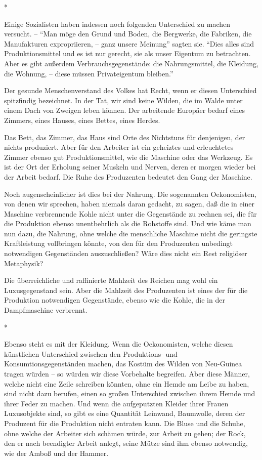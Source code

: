 \documentclass{scrbook}
\begin{document}
\begin{center}*\end{center}

Einige Sozialisten haben indessen noch folgenden Unterschied zu machen versucht. – ``Man möge den Grund und Boden, die Bergwerke, die Fabriken, die Manufakturen expropriieren, – ganz unsere Meinung'' sagten sie. ``Dies alles sind Produktionsmittel und es ist nur gerecht, sie als unser Eigentum zu betrachten. Aber es gibt außerdem Verbrauchsgegenstände: die Nahrungsmittel, die Kleidung, die Wohnung, – diese müssen Privateigentum bleiben.''

Der gesunde Menschenverstand des Volkes hat Recht, wenn er diesen Unterschied spitzfindig bezeichnet. In der Tat, wir sind keine Wilden, die im Walde unter einem Dach von Zweigen leben können. Der arbeitende Europäer bedarf eines Zimmers, eines Hauses, eines Bettes, eines Herdes.

Das Bett, das Zimmer, das Haus sind Orte des Nichtstuns für denjenigen, der nichts produziert. Aber für den Arbeiter ist ein geheiztes und erleuchtetes Zimmer ebenso gut Produktionsmittel, wie die Maschine oder das Werkzeug. Es ist der Ort der Erholung seiner Muskeln und Nerven, deren er morgen wieder bei der Arbeit bedarf. Die Ruhe des Produzenten bedeutet den Gang der Maschine.

Noch augenscheinlicher ist dies bei der Nahrung. Die sogenannten Oekonomisten, von denen wir sprechen, haben niemals daran gedacht, zu sagen, daß die in einer Maschine verbrennende Kohle nicht unter die Gegenstände zu rechnen sei, die für die Produktion ebenso unentbehrlich als die Rohstoffe sind. Und wie käme man nun dazu, die Nahrung, ohne welche die menschliche Maschine nicht die geringste Kraftleistung vollbringen könnte, von den für den Produzenten unbedingt notwendigen Gegenständen auszuschließen? Wäre dies nicht ein Rest religiöser Metaphysik?

Die überreichliche und raffinierte Mahlzeit des Reichen mag wohl ein Luxusgegenstand sein. Aber die Mahlzeit des Produzenten ist eines der für die Produktion notwendigen Gegenstände, ebenso wie die Kohle, die in der Dampfmaschine verbrennt.

\begin{center}*\end{center}

Ebenso steht es mit der Kleidung. Wenn die Oekonomisten, welche diesen künstlichen Unterschied zwischen den Produktions- und Konsumtionsgegenständen machen, das Kostüm des Wilden von Neu-Guinea tragen würden – so würden wir diese Vorbehalte begreifen. Aber diese Männer, welche nicht eine Zeile schreiben könnten, ohne ein Hemde am Leibe zu haben, sind nicht dazu berufen, einen so großen Unterschied zwischen ihrem Hemde und ihrer Feder zu machen. Und wenn die aufgeputzten Kleider ihrer Frauen Luxusobjekte sind, so gibt es eine Quantität Leinwand, Baumwolle, deren der Produzent für die Produktion nicht entraten kann. Die Bluse und die Schuhe, ohne welche der Arbeiter sich schämen würde, zur Arbeit zu gehen; der Rock, den er nach beendigter Arbeit anlegt, seine Mütze sind ihm ebenso notwendig, wie der Amboß und der Hammer.
\end{document}
